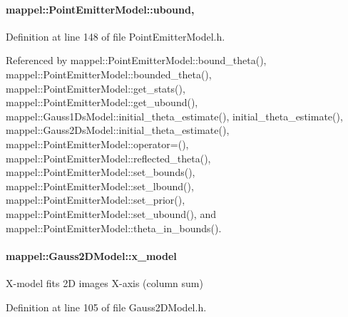 \paragraph[{\texorpdfstring{ubound}{ubound}}]{ mappel\+::\+Point\+Emitter\+Model\+::ubound\hspace{0.3cm}{\ttfamily [protected]}, {\ttfamily [inherited]}}\hypertarget{classmappel_1_1PointEmitterModel_a35b883e84b6a2e0093bdf482c623beef}{}\label{classmappel_1_1PointEmitterModel_a35b883e84b6a2e0093bdf482c623beef}


Definition at line 148 of file Point\+Emitter\+Model.\+h.



Referenced by mappel\+::\+Point\+Emitter\+Model\+::bound\+\_\+theta(), mappel\+::\+Point\+Emitter\+Model\+::bounded\+\_\+theta(), mappel\+::\+Point\+Emitter\+Model\+::get\+\_\+stats(), mappel\+::\+Point\+Emitter\+Model\+::get\+\_\+ubound(), mappel\+::\+Gauss1\+Ds\+Model\+::initial\+\_\+theta\+\_\+estimate(), initial\+\_\+theta\+\_\+estimate(), mappel\+::\+Gauss2\+Ds\+Model\+::initial\+\_\+theta\+\_\+estimate(), mappel\+::\+Point\+Emitter\+Model\+::operator=(), mappel\+::\+Point\+Emitter\+Model\+::reflected\+\_\+theta(), mappel\+::\+Point\+Emitter\+Model\+::set\+\_\+bounds(), mappel\+::\+Point\+Emitter\+Model\+::set\+\_\+lbound(), mappel\+::\+Point\+Emitter\+Model\+::set\+\_\+prior(), mappel\+::\+Point\+Emitter\+Model\+::set\+\_\+ubound(), and mappel\+::\+Point\+Emitter\+Model\+::theta\+\_\+in\+\_\+bounds().

\paragraph[{\texorpdfstring{x\+\_\+model}{x_model}}]{ mappel\+::\+Gauss2\+D\+Model\+::x\+\_\+model\hspace{0.3cm}{\ttfamily [protected]}}\hypertarget{classmappel_1_1Gauss2DModel_a2ed99bc290decb31ad1f6b7d106aad38}{}\label{classmappel_1_1Gauss2DModel_a2ed99bc290decb31ad1f6b7d106aad38}
X-\/model fits 2D images X-\/axis (column sum) 

Definition at line 105 of file Gauss2\+D\+Model.\+h.



